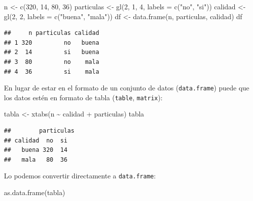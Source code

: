 \documentclass[
]{book}
\newenvironment{Shaded}{\begin{snugshade}}{\end{snugshade}}
\newcommand{\AttributeTok}[1]{\textcolor[rgb]{0.77,0.63,0.00}{#1}}
\newcommand{\DecValTok}[1]{\textcolor[rgb]{0.00,0.00,0.81}{#1}}
\newcommand{\FunctionTok}[1]{\textcolor[rgb]{0.00,0.00,0.00}{#1}}
\newcommand{\NormalTok}[1]{#1}
\newcommand{\OtherTok}[1]{\textcolor[rgb]{0.56,0.35,0.01}{#1}}
\newcommand{\SpecialCharTok}[1]{\textcolor[rgb]{0.00,0.00,0.00}{#1}}
\newcommand{\StringTok}[1]{\textcolor[rgb]{0.31,0.60,0.02}{#1}}
\theoremstyle{break}
\theoremstyle{definition}
\theoremstyle{definition}
\theoremstyle{definition}
\theoremstyle{definition}
\theoremstyle{remark}
\begin{document}
\begin{Shaded}
\begin{Highlighting}[]
\NormalTok{n }\OtherTok{\textless{}{-}} \FunctionTok{c}\NormalTok{(}\DecValTok{320}\NormalTok{, }\DecValTok{14}\NormalTok{, }\DecValTok{80}\NormalTok{, }\DecValTok{36}\NormalTok{)}
\NormalTok{particulas }\OtherTok{\textless{}{-}} \FunctionTok{gl}\NormalTok{(}\DecValTok{2}\NormalTok{, }\DecValTok{1}\NormalTok{, }\DecValTok{4}\NormalTok{, }\AttributeTok{labels =} \FunctionTok{c}\NormalTok{(}\StringTok{"no"}\NormalTok{, }\StringTok{"si"}\NormalTok{))}
\NormalTok{calidad }\OtherTok{\textless{}{-}} \FunctionTok{gl}\NormalTok{(}\DecValTok{2}\NormalTok{, }\DecValTok{2}\NormalTok{, }\AttributeTok{labels =} \FunctionTok{c}\NormalTok{(}\StringTok{"buena"}\NormalTok{, }\StringTok{"mala"}\NormalTok{))}
\NormalTok{df }\OtherTok{\textless{}{-}} \FunctionTok{data.frame}\NormalTok{(n, particulas, calidad)}
\NormalTok{df}
\end{Highlighting}
\end{Shaded}

\begin{verbatim}
##     n particulas calidad
## 1 320         no   buena
## 2  14         si   buena
## 3  80         no    mala
## 4  36         si    mala
\end{verbatim}

En lugar de estar en el formato de un conjunto de datos (\texttt{data.frame})
puede que los datos estén en formato de tabla (\texttt{table}, \texttt{matrix}):

\begin{Shaded}
\begin{Highlighting}[]
\NormalTok{tabla }\OtherTok{\textless{}{-}} \FunctionTok{xtabs}\NormalTok{(n }\SpecialCharTok{\textasciitilde{}}\NormalTok{ calidad }\SpecialCharTok{+}\NormalTok{ particulas)}
\NormalTok{tabla}
\end{Highlighting}
\end{Shaded}

\begin{verbatim}
##        particulas
## calidad  no  si
##   buena 320  14
##   mala   80  36
\end{verbatim}

Lo podemos convertir directamente a \texttt{data.frame}:

\begin{Shaded}
\begin{Highlighting}[]
\FunctionTok{as.data.frame}\NormalTok{(tabla)}
\end{Highlighting}
\end{Shaded}
\end{document}

